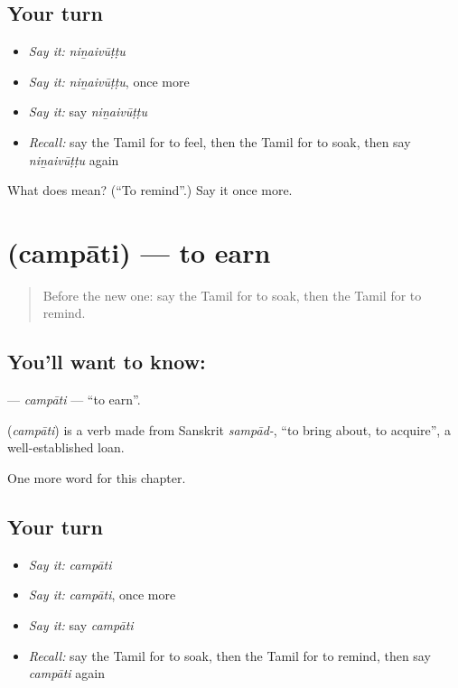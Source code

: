 \subsection*{Your turn}
\begin{itemize}
\raggedright
  \item \emph{Say it:} \emph{niṉaivūṭṭu}
  \item \emph{Say it:} \emph{niṉaivūṭṭu}, once more
  \item \emph{Say it:} say \emph{niṉaivūṭṭu}
  \item \emph{Recall:} say the Tamil for to feel, then the Tamil for to soak, then say \emph{niṉaivūṭṭu} again
\end{itemize}

\begin{tcolorbox}[breakable,colback=teal!4,colframe=teal!35!black,title={Before you move on}]
What does  mean? (\textquotedblleft{}To remind\textquotedblright{}.) Say it once more.
\end{tcolorbox}
\section[\texorpdfstring{\ta{சம்பாதி} (campāti)}{சம்பாதி (campāti)}]{ (campāti) — to earn}

\label{lesson:TA-C197-campati}



\begin{quote}
Before the new one: say the Tamil for to soak, then the Tamil for to remind.
\end{quote}

\subsection*{You'll want to know: }
\textbf{} — \emph{campāti} — \textquotedblleft{}to earn\textquotedblright{}.

\begin{cousinweb}
\textbf{} (\emph{campāti}) is a verb made from Sanskrit \emph{sampād-}, \textquotedblleft{}to bring about, to acquire\textquotedblright{}, a well-established loan.
\end{cousinweb}

\begin{grammarlens}[title={What you've built}]
One more word for this chapter.
\end{grammarlens}

\subsection*{Your turn}
\begin{itemize}
\raggedright
  \item \emph{Say it:} \emph{campāti}
  \item \emph{Say it:} \emph{campāti}, once more
  \item \emph{Say it:} say \emph{campāti}
  \item \emph{Recall:} say the Tamil for to soak, then the Tamil for to remind, then say \emph{campāti} again
\end{itemize}

